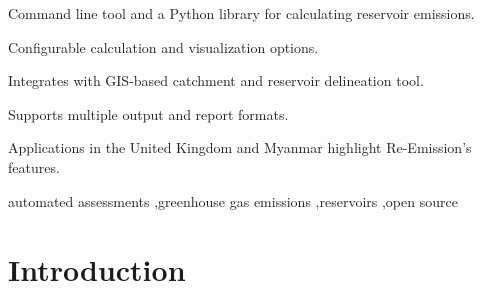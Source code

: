 \documentclass[final,1p,times]{elsarticle}
\begin{document}
\begin{frontmatter}
\begin{highlights}
\item Command line tool and a Python library for calculating reservoir emissions.
\item Configurable calculation and visualization options.
\item Integrates with \acs{GIS}-based catchment and reservoir delineation tool.
\item Supports multiple output and report formats.
\item Applications in the United Kingdom and Myanmar highlight Re-Emission's features.
\end{highlights}

\begin{keyword}
automated assessments \sep greenhouse gas emissions \sep reservoirs \sep open source
\end{keyword}

\end{frontmatter}

\section{Introduction}
\label{sec:introduction}
\end{document}
